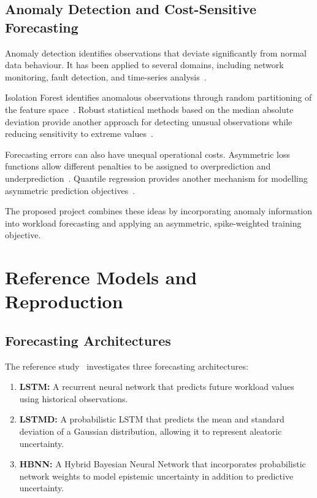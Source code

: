 \documentclass[conference]{IEEEtran}
\begin{document}
\subsection{Anomaly Detection and Cost-Sensitive Forecasting}

Anomaly detection identifies observations that deviate significantly from normal data behaviour. It has been applied to several domains, including network monitoring, fault detection, and time-series analysis~\cite{chandola2009}.

Isolation Forest identifies anomalous observations through random partitioning of the feature space~\cite{liu2008}. Robust statistical methods based on the median absolute deviation provide another approach for detecting unusual observations while reducing sensitivity to extreme values~\cite{leys2013}.

Forecasting errors can also have unequal operational costs. Asymmetric loss functions allow different penalties to be assigned to overprediction and underprediction~\cite{zellner1986}. Quantile regression provides another mechanism for modelling asymmetric prediction objectives~\cite{koenker1978}.

The proposed project combines these ideas by incorporating anomaly information into workload forecasting and applying an asymmetric, spike-weighted training objective.

\section{Reference Models and Reproduction}

\subsection{Forecasting Architectures}

The reference study~\cite{rossi2025} investigates three forecasting architectures:

\begin{enumerate}
\item \textbf{LSTM:} A recurrent neural network that predicts future workload values using historical observations.

\item \textbf{LSTMD:} A probabilistic LSTM that predicts the mean and standard deviation of a Gaussian distribution, allowing it to represent aleatoric uncertainty.

\item \textbf{HBNN:} A Hybrid Bayesian Neural Network that incorporates probabilistic network weights to model epistemic uncertainty in addition to predictive uncertainty.
\end{enumerate}
\end{document}
